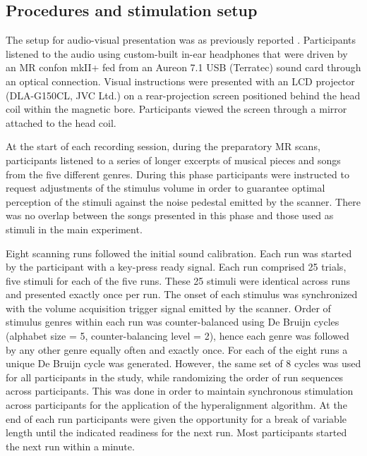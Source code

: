 \subsection*{Procedures and stimulation setup}

The setup for audio-visual presentation was as previously reported
\cite{Hanke_2014}. Participants listened to the audio using custom-built in-ear
headphones that were driven by an MR confon mkII+ fed from an Aureon 7.1 USB
(Terratec) sound card through an optical connection.
Visual instructions were presented with an LCD projector (DLA-G150CL, JVC Ltd.)
on a rear-projection screen positioned behind the head coil within the magnetic
bore. Participants viewed the screen through a mirror attached to the head
coil.

At the start of each recording session, during the preparatory MR scans,
participants listened to a series of longer excerpts of musical pieces and
songs from the five different genres. During this phase participants were
instructed to request adjustments of the stimulus volume in order to guarantee
optimal perception of the stimuli against the noise pedestal emitted by the
scanner. There was no overlap between the songs presented in this phase and those
used as stimuli in the main experiment.

Eight scanning runs followed the initial sound calibration. Each run was
started by the participant with a key-press ready signal. Each run comprised 25
trials, five stimuli for each of the five runs. These 25 stimuli were identical
across runs and presented exactly once per run. The onset of each stimulus was
synchronized with the volume acquisition trigger signal emitted by the scanner.
Order of stimulus genres within each run was counter-balanced using De Bruijn
cycles \cite{Aguirre_2011} (alphabet size = 5, counter-balancing level = 2),
hence each genre was followed by any other genre equally often and exactly
once.  For each of the eight runs a unique De Bruijn cycle was generated.
However, the same set of 8 cycles was used for all participants in the study,
while randomizing the order of run sequences across participants. This was done
in order to maintain synchronous stimulation across participants for the
application of the hyperalignment algorithm. At the end of each run
participants were given the opportunity for a break of variable length until
the indicated readiness for the next run. Most participants started the next
run within a minute.

